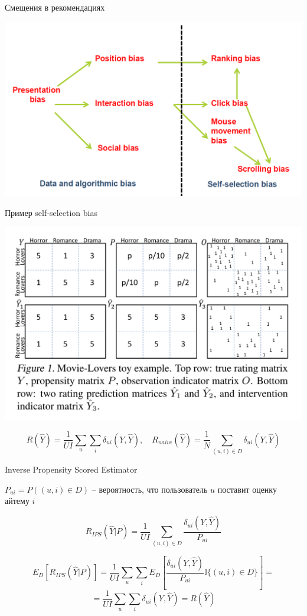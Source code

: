 \documentclass[11pt,aspectratio=169,handout]{beamer}
\begin{document}
\begin{frame}{Смещения в рекомендациях \cite{BIAS}}

\begin{center}
\includegraphics[scale=0.2]{images/bias.png}
\end{center}

\end{frame}

\begin{frame}{Пример self-selection bias}

\begin{center}
\includegraphics[scale=0.3]{images/bias-example.png}
\end{center}

\[
R(\hat Y) = \frac{1}{U I} \sum_u \sum_i \delta_{ui} (Y, \hat Y), \quad R_{naive}(\hat Y) = \frac{1}{N} \sum_{(u,i) \in D} \delta_{ui}(Y, \hat Y)
\]

\end{frame}

\begin{frame}{Inverse Propensity Scored Estimator \cite{TREATMENTS}}

$P_{ui} = P((u, i) \in D)$ -- вероятность, что пользователь $u$ поставит оценку айтему $i$

\[
R_{IPS}(\hat Y | P) = \frac{1}{U I} \sum_{(u,i) \in D} \frac{\delta_{ui}(Y, \hat Y)}{P_{ui}}
\]

\[
E_D [R_{IPS}(\hat Y | P)] = \frac{1}{U I} \sum_u \sum_i E_D\left[ \frac{\delta_{ui}(Y, \hat Y)}{P_{ui}} \mathbb{I}\{(u, i) \in D\}\right] = 
\]
\[
= \frac{1}{U I} \sum_u \sum_i \delta_{ui} (Y, \hat Y) = R(\hat Y) 
\]

\end{frame}
\end{document}
